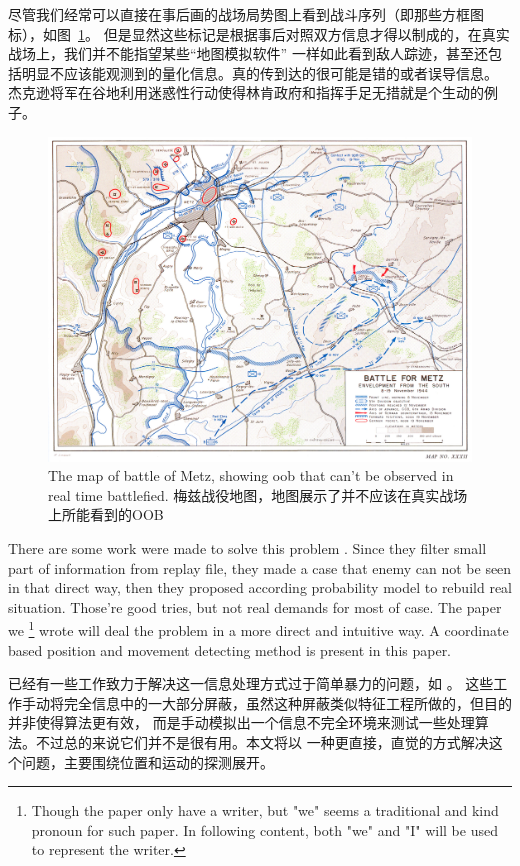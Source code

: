 \documentclass{article}
\begin{document}
尽管我们经常可以直接在事后画的战场局势图上看到战斗序列（即那些方框图标），如图~\ref{fig:metz}。
但是显然这些标记是根据事后对照双方信息才得以制成的，在真实战场上，我们并不能指望某些“地图模拟软件”
一样如此看到敌人踪迹，甚至还包括明显不应该能观测到的量化信息。真的传到达的很可能是错的或者误导信息。
杰克逊将军在谷地利用迷惑性行动使得林肯政府和指挥手足无措就是个生动的例子。


\begin{figure}[ht]
\includegraphics[width=0.6\linewidth]{metz.jpg}
\caption{The map of battle of Metz, showing oob that can't be observed in real time battlefied.
梅兹战役地图，地图展示了并不应该在真实战场上所能看到的OOB }
\label{fig:metz}
\end{figure}


There are some work were made to solve this problem 
\cite{hostetler2012inferring} \cite{vsmejkal2016integrating} \cite{touhou}.
Since they filter small part of information from replay file, they made a case that enemy can not be 
seen in that direct way, then they proposed according probability model to rebuild real situation.
Those're good tries, but not real demands for most of case. The paper we
\footnote{Though the paper only have a writer, 
but "we" seems a traditional and kind pronoun for such paper. 
In following content, both "we" and "I" will be used to represent the writer.} 
wrote will deal the problem in a more direct and intuitive way. 
A coordinate based position and movement detecting method is present in this paper.

已经有一些工作致力于解决这一信息处理方式过于简单暴力的问题，如
\cite{hostetler2012inferring} \cite{vsmejkal2016integrating} \cite{touhou}。
这些工作手动将完全信息中的一大部分屏蔽，虽然这种屏蔽类似特征工程所做的，但目的并非使得算法更有效，
而是手动模拟出一个信息不完全环境来测试一些处理算法。不过总的来说它们并不是很有用。本文将以
一种更直接，直觉的方式解决这个问题，主要围绕位置和运动的探测展开。
\end{document}
